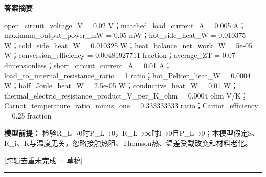 \documentclass[UTF8,11pt,a4paper]{ctexart}
\begin{document}
\noindent\textbf{答案摘要}\par
open\_circuit\_voltage\_V = 0.02 V；matched\_load\_current\_A = 0.005 A；maximum\_output\_power\_mW = 0.05 mW；hot\_side\_heat\_W = 0.010375 W；cold\_side\_heat\_W = 0.010325 W；heat\_balance\_net\_work\_W = 5e-05 W；conversion\_efficiency = 0.00481927711 fraction；average\_ZT = 0.07 dimensionless；short\_circuit\_current\_A = 0.01 A；load\_to\_internal\_resistance\_ratio = 1 ratio；hot\_Peltier\_heat\_W = 0.0004 W；half\_Joule\_heat\_W = 2.5e-05 W；conductive\_heat\_W = 0.01 W；thermal\_electric\_resistance\_product\_V\_per\_K\_ohm = 0.0004 ohm V/K；Carnot\_temperature\_ratio\_minus\_one = 0.333333333 ratio；Carnot\_efficiency = 0.25 fraction\par
\noindent\textbf{模型前提：}
检验R\_L→0时P\_L→0，R\_L→∞时I→0且P\_L→0；本模型假定S、R\_i、K与温度无关，忽略接触热阻、Thomson热、温差受载改变和材料老化。\par
\noindent\textcolor{red!65!black}{[跨辑去重未完成 · 草稿]} \par
\medskip\hrule\medskip
\end{document}
